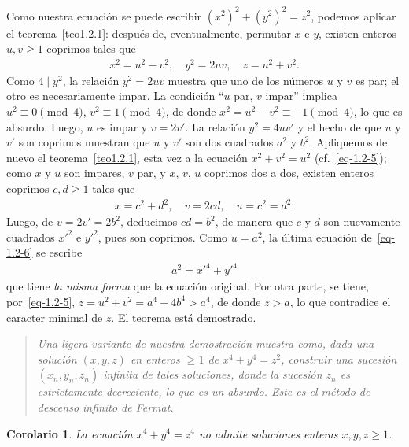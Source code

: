\documentclass[bibtotoc,leqno,spanish]{amsbook}
\numberwithin{equation}{section}
\newenvironment{comm}%
	{\begin{quotation}\itshape}
	{\end{quotation}}
\theoremstyle{note}
\theoremstyle{note}
\newtheorem*{corollary*}{Corolario}
\theoremstyle{rem}
\numberwithin{theorem}{section}
\numberwithin{proposition}{section}
\numberwithin{definition}{section}
\numberwithin{lemma}{section}
\numberwithin{corollary}{section}
\numberwithin{example}{section}
\numberwithin{footnote}{section}%
\begin{document}
Como nuestra
ecuaci\'on se puede escribir $(x^{2})^{2}+(y^{2})^{2}=z^{2}$, podemos aplicar el teorema~\ref{teo1.2.1}: despu\'es
de, eventualmente, permutar $x$ e $y$, existen enteros $u, v\geq 1$ coprimos tales que
\begin{gather}\label{eq-1.2-5}
x^{2} = u^{2}-v^{2},\quad y^{2} = 2uv,\quad z = u^{2}+v^{2}.
\end{gather}
Como $4\mid y^{2}$, la relaci\'on $y^{2} = 2uv$ muestra que uno de los n\'umeros $u$ y $v$ es
par; el otro es necesariamente impar. La condici\'on ``$u$ par, $v$ impar'' implica
$u^{2}\equiv 0\pmod 4$, $v^{2}\equiv 1\pmod 4$, de donde $x^{2}=u^{2}-v^{2}\equiv -1\pmod 4$,
lo que es absurdo. Luego, $u$ es impar y $v = 2v'$. La relaci\'on $y^{2} = 4uv'$ y el hecho
de que $u$ y $v'$ son coprimos muestran que $u$ y $v'$ son dos cuadrados $a^{2}$ y $b^{2}$.
Apliquemos de nuevo el teorema~\ref{teo1.2.1}, esta vez a la ecuaci\'on $x^{2}+v^{2} = u^{2}$ (cf.~\eqref{eq-1.2-5});
como $x$ y $u$ son impares, $v$ par, y $x$, $v$, $u$ coprimos dos a dos, existen enteros coprimos
$c,d\geq 1$ tales que
\begin{gather}\label{eq-1.2-6}
x = c^{2}+d^{2},\quad v = 2cd,\quad u=c^{2}=d^{2}.
\end{gather}
Luego, de $v = 2v' = 2b^{2}$, deducimos $cd = b^{2}$, de manera que $c$ y $d$ son nuevamente
cuadrados $x'^{2}$ e $y'^{2}$, pues son coprimos. Como $u=a^{2}$, la \'ultima ecuaci\'on de~\eqref{eq-1.2-6}
se escribe
\begin{gather}
a^{2} = x'^{4}+y'^{4}
\end{gather}
que tiene {\em la misma forma} que la ecuaci\'on original. Por otra parte, se tiene, por~\eqref{eq-1.2-5},
$z = u^{2}+v^{2} = a^{4}+4b^{4} > a^{4}$, de donde $z > a$, lo que contradice el caracter minimal
de $z$. El teorema est\'a demostrado.

\begin{comm}
Una ligera variante de nuestra demostraci\'on muestra como, dada una soluci\'on $(x,y,z)$
en enteros $\geq 1$ de $x^{4}+y^{4}=z^{2}$, construir una sucesi\'on $(x_{n},y_{n},z_{n})$
infinita de tales soluciones, donde la sucesi\'on $z_{n}$ es estrictamente decreciente, lo
que es un absurdo. Este es el m\'etodo de {\em descenso infinito} de Fermat.
\end{comm}

\begin{corollary*}
La ecuaci\'on $x^{4}+y^{4}=z^{4}$ no admite soluciones enteras $x,y,z\geq 1$.
\end{corollary*}
\end{document}
